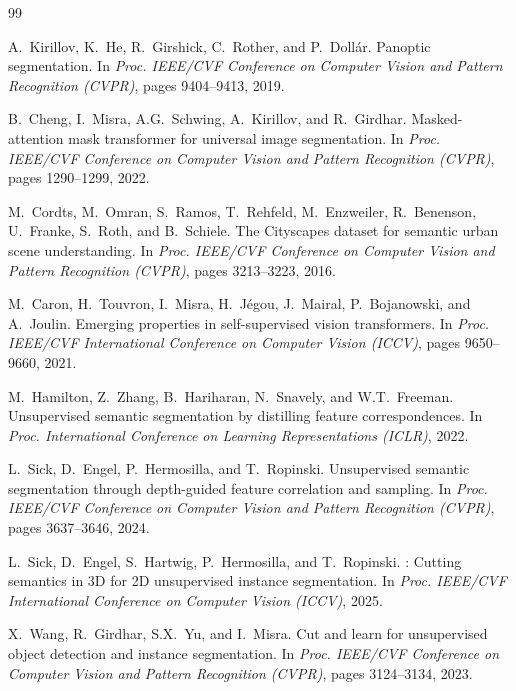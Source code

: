 \documentclass{article}
\begin{document}
\begin{thebibliography}{99}

A.~Kirillov, K.~He, R.~Girshick, C.~Rother, and P.~Doll{\'a}r.
\newblock Panoptic segmentation.
\newblock In \emph{Proc. IEEE/CVF Conference on Computer Vision and Pattern Recognition (CVPR)}, pages 9404--9413, 2019.

B.~Cheng, I.~Misra, A.G.~Schwing, A.~Kirillov, and R.~Girdhar.
\newblock Masked-attention mask transformer for universal image segmentation.
\newblock In \emph{Proc. IEEE/CVF Conference on Computer Vision and Pattern Recognition (CVPR)}, pages 1290--1299, 2022.

M.~Cordts, M.~Omran, S.~Ramos, T.~Rehfeld, M.~Enzweiler, R.~Benenson, U.~Franke, S.~Roth, and B.~Schiele.
\newblock The {C}ityscapes dataset for semantic urban scene understanding.
\newblock In \emph{Proc. IEEE/CVF Conference on Computer Vision and Pattern Recognition (CVPR)}, pages 3213--3223, 2016.

M.~Caron, H.~Touvron, I.~Misra, H.~J{\'e}gou, J.~Mairal, P.~Bojanowski, and A.~Joulin.
\newblock Emerging properties in self-supervised vision transformers.
\newblock In \emph{Proc. IEEE/CVF International Conference on Computer Vision (ICCV)}, pages 9650--9660, 2021.

M.~Hamilton, Z.~Zhang, B.~Hariharan, N.~Snavely, and W.T.~Freeman.
\newblock Unsupervised semantic segmentation by distilling feature correspondences.
\newblock In \emph{Proc. International Conference on Learning Representations (ICLR)}, 2022.

L.~Sick, D.~Engel, P.~Hermosilla, and T.~Ropinski.
\newblock Unsupervised semantic segmentation through depth-guided feature correlation and sampling.
\newblock In \emph{Proc. IEEE/CVF Conference on Computer Vision and Pattern Recognition (CVPR)}, pages 3637--3646, 2024.

L.~Sick, D.~Engel, S.~Hartwig, P.~Hermosilla, and T.~Ropinski.
: Cutting semantics in {3D} for {2D} unsupervised instance segmentation.
\newblock In \emph{Proc. IEEE/CVF International Conference on Computer Vision (ICCV)}, 2025.

X.~Wang, R.~Girdhar, S.X.~Yu, and I.~Misra.
\newblock Cut and learn for unsupervised object detection and instance segmentation.
\newblock In \emph{Proc. IEEE/CVF Conference on Computer Vision and Pattern Recognition (CVPR)}, pages 3124--3134, 2023.


\end{thebibliography}
\end{document}
